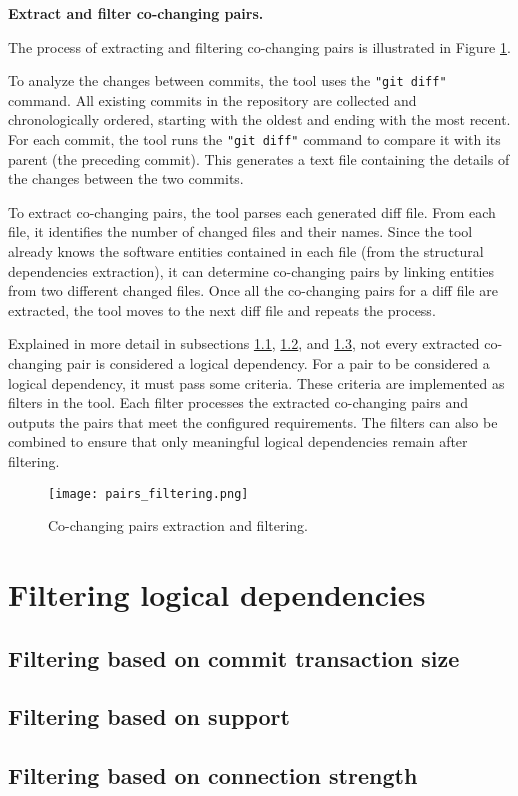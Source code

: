 \textbf{Extract and filter co-changing pairs.}

The process of extracting and filtering co-changing pairs is illustrated in Figure \ref{fig:figfiltering}.

To analyze the changes between commits, the tool uses the \texttt{"git diff"} command. All existing commits in the repository are collected and chronologically ordered, starting with the oldest and ending with the most recent. For each commit, the tool runs the \texttt{"git diff"} command to compare it with its parent (the preceding commit). This generates a text file containing the details of the changes between the two commits.

To extract co-changing pairs, the tool parses each generated diff file. From each file, it identifies the number of changed files and their names. Since the tool already knows the software entities contained in each file (from the structural dependencies extraction), it can determine co-changing pairs by linking entities from two different changed files. Once all the co-changing pairs for a diff file are extracted, the tool moves to the next diff file and repeats the process.

Explained in more detail in subsections \ref{subsec:filtering_transaction_size}, \ref{subsec:filtering_support}, and \ref{subsec:filtering_connection_strength}, not every extracted co-changing pair is considered a logical dependency. For a pair to be considered a logical dependency, it must pass some criteria. These criteria are implemented as filters in the tool. Each filter processes the extracted co-changing pairs and outputs the pairs that meet the configured requirements. The filters can also be combined to ensure that only meaningful logical dependencies remain after filtering.

\begin{figure}[H]
\centering
\texttt{[image: pairs\_filtering.png]}
\caption{Co-changing pairs extraction and filtering.}
\label{fig:figfiltering}
\end{figure}



\section{Filtering logical dependencies}
\label{sec:filtering_logical_dependencies}

\subsection{Filtering based on commit transaction size}
\label{subsec:filtering_transaction_size}

\subsection{Filtering based on support}
\label{subsec:filtering_support}


\subsection{Filtering based on connection strength}
\label{subsec:filtering_connection_strength}

